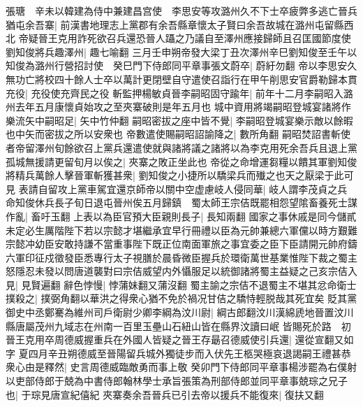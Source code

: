 張瑭　辛未以韓建為侍中兼建昌宫使　李思安等攻潞州久不下士卒疲弊多逃亡晉兵猶屯余吾寨|{
	前漢書地理志上黨郡有余吾縣章懷太子賢曰余吾故城在潞州屯留縣西北}
帝疑晉王克用詐死欲召兵還恐晉人躡之乃議自至澤州應接歸師且召匡國節度使劉知俊將兵趣澤州|{
	趣七喻翻}
三月壬申朔帝發大梁丁丑次澤州辛巳劉知俊至壬午以知俊為潞州行營招討使　癸巳門下侍郎同平章事張文蔚卒|{
	蔚紆勿翻}
帝以李思安久無功亡將校四十餘人士卒以萬計更閉壁自守遣使召詣行在甲午削思安官爵勒歸本貫充役|{
	充役使充齊民之役}
斬監押楊敏貞晉李嗣昭固守踰年|{
	前年十二月李嗣昭入潞州去年五月康懷貞始攻之至夾寨破則是年五月也}
城中資用將竭嗣昭登城宴諸將作樂流矢中嗣昭足|{
	矢中竹仲翻}
嗣昭密拔之座中皆不覺|{
	李嗣昭登城宴樂示敵以餘暇也中矢而密拔之所以安衆也}
帝數遣使賜嗣昭詔諭降之|{
	數所角翻}
嗣昭焚詔書斬使者帝留澤州旬餘欲召上黨兵還遣使就與諸將議之諸將以為李克用死余吾兵且退上黨孤城無援請更留旬月以俟之|{
	夾寨之敗正坐此也}
帝從之命增運芻糧以饋其軍劉知俊將精兵萬餘人擊晉軍斬獲甚衆|{
	劉知俊之小捷所以驕梁兵而殱之也天之厭梁于此可見}
表請自留攻上黨車駕宜還京師帝以關中空虚慮岐人侵同華|{
	岐人謂李茂貞之兵}
命知俊休兵長子旬日退屯晉州俟五月歸鎮　蜀太師王宗佶既罷相怨望隂畜養死士謀作亂|{
	畜吁玉翻}
上表以為臣官預大臣親則長子|{
	長知兩翻}
國家之事休戚是同今儲貳未定必生厲階陛下若以宗懿才堪繼承宜早行冊禮以臣為元帥兼總六軍儻以時方艱難宗懿冲幼臣安敢持謙不當重事陛下既正位南面軍旅之事宜委之臣下臣請開元帥府鑄六軍印征戍徵發臣悉專行太子視膳於晨昏微臣握兵於環衛萬世基業惟陛下裁之蜀主怒隱忍未發以問唐道襲對曰宗佶威望内外懾服足以統御諸將蜀主益疑之己亥宗佶入見|{
	見賢遍翻}
辭色悖慢|{
	悖蒲妹翻又蒲沒翻}
蜀主諭之宗佶不退蜀主不堪其忿命衛士撲殺之|{
	撲弼角翻以華洪之得衆心猶不免於禍况甘佶之驕恃輕脱哉其死宜矣}
貶其黨御史中丞鄭騫為維州司戶衛尉少卿李綱為汶川尉|{
	綱古郎翻汶川漢綿虒地晉置汶川縣唐屬茂州九域志在州南一百里玉壘山石紐山皆在縣界汶讀曰岷}
皆賜死於路　初晉王克用卒周德威握重兵在外國人皆疑之晉王存朂召德威使引兵還|{
	還從宣翻又如字}
夏四月辛丑朔德威至晉陽留兵城外獨徒步而入伏先王柩哭極哀退謁嗣王禮甚恭衆心由是釋然|{
	史言周德威臨敵勇而事上敬}
癸卯門下侍郎同平章事楊涉罷為右僕射以吏部侍郎于兢為中書侍郎翰林學士承旨張策為刑部侍郎並同平章事兢琮之兄子也|{
	于琮見唐宣紀僖紀}
夾寨奏余吾晉兵已引去帝以援兵不能復來|{
	復扶又翻}


